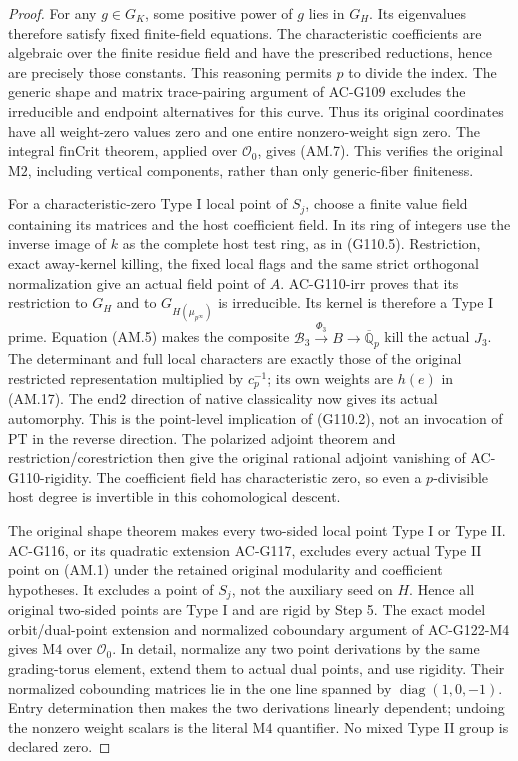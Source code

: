 \begin{proof}
For any \(g\in G_K\), some positive power of \(g\) lies
in \(G_H\).  Its eigenvalues therefore satisfy fixed
finite-field equations.  The characteristic coefficients
are algebraic over the finite residue field and have the
prescribed reductions, hence are precisely those constants.
This reasoning permits \(p\) to divide the index.
The generic shape and matrix trace-pairing argument of
AC-G109 excludes the irreducible and endpoint alternatives
for this curve.  Thus its original coordinates have all
weight-zero values zero and one entire nonzero-weight
sign zero.  The integral \(\mathrm{finCrit}\) theorem,
applied over \(\mathcal O_0\), gives (AM.7).
This verifies the original \(\mathrm{M2}\), including
vertical components, rather than only generic-fiber
finiteness.

For a characteristic-zero Type I local point of \(S_j\),
choose a finite value field containing its matrices and
the host coefficient field.  In its ring of integers use
the inverse image of \(k\) as the complete host test ring,
as in (G110.5).  Restriction, exact away-kernel killing,
the fixed local flags and the same strict orthogonal
normalization give an actual field point of \(A\).
AC-G110-irr proves that its restriction to \(G_H\) and
to \(G_{H(\mu_{p^\infty})}\) is irreducible.  Its kernel
is therefore a Type I prime.
Equation (AM.5) makes the composite
\(\mathcal B_3\xrightarrow{\Phi_3}B\to\overline{\mathbb Q}_p\)
kill the actual \(J_3\).
The determinant and full local characters are exactly
those of the original restricted representation multiplied
by \(c_p^{-1}\); its own weights are \(h(e)\) in (AM.17).
The \(\mathrm{end2}\) direction of native classicality
now gives its actual automorphy.
This is the point-level implication of (G110.2), not
an invocation of \(\mathrm{PT}\) in the reverse direction.
The polarized adjoint theorem and restriction/corestriction
then give the original rational adjoint vanishing of
AC-G110-rigidity.  The coefficient field has characteristic
zero, so even a \(p\)-divisible host degree is invertible
in this cohomological descent.

The original shape theorem makes every two-sided local point
Type I or Type II.  AC-G116, or its quadratic extension
AC-G117, excludes every actual Type II point on (AM.1)
under the retained original modularity and coefficient
hypotheses.  It excludes a point of \(S_j\), not the
auxiliary seed on \(H\).  Hence all original two-sided
points are Type I and are rigid by Step 5.
The exact model orbit/dual-point extension and normalized
coboundary argument of AC-G122-M4 gives \(\mathrm{M4}\)
over \(\mathcal O_0\).  In detail, normalize any two
point derivations by the same grading-torus element,
extend them to actual dual points, and use rigidity.
Their normalized cobounding matrices lie in the one
line spanned by \(\operatorname{diag}(1,0,-1)\).
Entry determination then makes the two derivations
linearly dependent; undoing the nonzero weight scalars
is the literal \(\mathrm{M4}\) quantifier.
No mixed Type II group is declared zero.


\end{proof}
